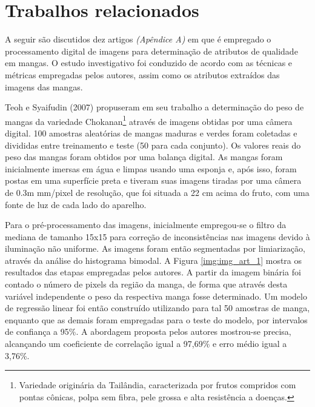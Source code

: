 

\section{Trabalhos relacionados}

A seguir são discutidos dez artigos \textit{(Apêndice A)} em que é empregado o processamento digital de imagens para determinação de atributos de qualidade em mangas. O estudo investigativo foi conduzido de acordo com as técnicas e métricas empregadas pelos autores, assim como os atributos extraídos das imagens das mangas. 

Teoh e Syaifudin (2007) propuseram em seu trabalho a determinação do peso de mangas da variedade Chokanan\footnote{\label{ftnote:chokanan}Variedade originária da Tailândia, caracterizada por frutos compridos com pontas cônicas, polpa sem fibra, pele grossa e alta resistência a doenças.} através de imagens obtidas por uma câmera digital. 100 amostras aleatórias de mangas maduras e verdes foram coletadas e divididas entre treinamento e teste (50 para cada conjunto). Os valores reais do peso das mangas foram obtidos por uma balança digital. As mangas foram inicialmente imersas em água e limpas usando uma esponja e, após isso, foram postas em uma superfície preta e tiveram suas imagens tiradas por uma câmera de 0.3m mm/pixel de resolução, que foi situada a 22 cm acima do fruto, com uma fonte de luz de cada lado do aparelho. 

Para o pré-processamento das imagens, inicialmente empregou-se o filtro da mediana de tamanho 15x15 para correção de inconsistências nas imagens devido à iluminação não uniforme. As imagens foram então segmentadas por limiarização, através da análise do histograma bimodal. A Figura \ref{img:img_art_1} mostra os resultados das etapas empregadas pelos autores. A partir da imagem binária foi contado o número de pixels da região da manga, de forma que através desta variável independente o peso da respectiva manga fosse determinado. Um modelo de regressão linear foi então construído utilizando para tal 50 amostras de manga, enquanto que as demais foram empregadas para o teste do modelo, por intervalos de confiança a 95\%. A abordagem proposta pelos autores mostrou-se precisa, alcançando um coeficiente de correlação igual a 97,69\% e erro médio igual a 3,76\%. 

